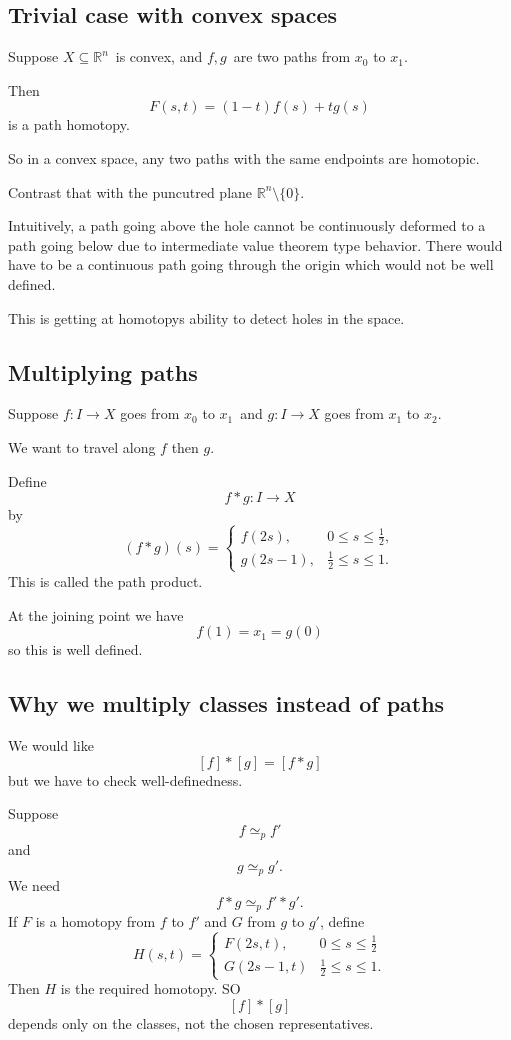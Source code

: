 \documentclass[11pt]{article}
\begin{document}
\subsection{Trivial case with convex spaces}

Suppose $X \subseteq \mathbb R^n$ is convex, 
and $f,g$ are two paths from $x_0$ to $x_1$. 

Then 
\[
    F(s,t) = (1-t)f(s) + tg(s)
\]
is a path homotopy. 

So in a convex space, any two paths 
with the same endpoints are homotopic. 

Contrast that with the puncutred plane 
$\mathbb R^n \setminus \{0\}$. 

Intuitively, a path going above the hole cannot be 
continuously deformed to a path going below due to 
intermediate value theorem type behavior. There 
would have to be a continuous path going through the 
origin which would not be well defined. 

This is getting at homotopys ability to detect holes in the 
space. 

\subsection{Multiplying paths} 

Suppose $f : I \to X$ goes from $x_0$ to $x_1$ and 
$g: I \to X$ goes from $x_1$ to $x_2$. 

We want to travel along $f$ then $g$. 

Define 
\[
    f * g : I \to X
\]
by 
\[
    (f*g)(s) 
    = 
    \begin{cases}
        f(2s), & 0 \leq s \leq \frac{1}{2}, \\ 
        g(2s-1), & \frac{1}{2} \leq s \leq 1. 
    \end{cases}
\]
This is called the path product. 

At the joining point we have 
\[
    f(1) = x_1 = g(0)
\]
so this is well defined. 

\subsection{Why we multiply classes instead of paths}

We would like 
\[
    [f] * [g] = [f * g] 
\]
but we have to check well-definedness. 

Suppose 
\[
    f\simeq_p f'
\]
and 
\[
    g \simeq_p g'.  
\]
We need 
\[
    f * g \simeq_p f' * g'. 
\]
If $F$ is a homotopy from $f$ to $f'$ and 
$G$ from $g$ to $g'$, define 
\[
    H(s,t) = 
    \begin{cases}
        F(2s,t), & 0 \leq s \leq \frac 1 2 \\ 
        G(2s - 1,t) & \frac 1 2 \leq s \leq 1. 
    \end{cases}
\]
Then $H$ is the required homotopy. 
SO 
\[
    [f] * [g]
\]
depends only on the classes, not the chosen representatives. 
\end{document}
